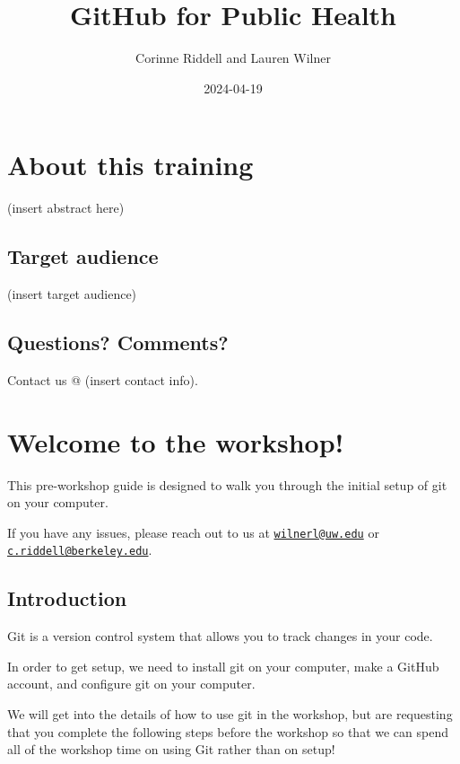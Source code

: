 \documentclass[
]{book}
\title{GitHub for Public Health}
\author{Corinne Riddell and Lauren Wilner}
\date{2024-04-19}
\begin{document}
\maketitle

{
\setcounter{tocdepth}{1}
\tableofcontents
}
\hypertarget{about-this-training}{%
\chapter{About this training}\label{about-this-training}}

(insert abstract here)

\hypertarget{target-audience}{%
\section{Target audience}\label{target-audience}}

(insert target audience)

\hypertarget{questions-comments}{%
\section{Questions? Comments?}\label{questions-comments}}

Contact us @ (insert contact info).

\hypertarget{welcome-to-the-workshop}{%
\chapter{Welcome to the workshop!}\label{welcome-to-the-workshop}}

This pre-workshop guide is designed to walk you through the initial setup of git on your computer.

If you have any issues, please reach out to us at \href{mailto:wilnerl@uw.edu}{\nolinkurl{wilnerl@uw.edu}} or \href{mailto:c.riddell@berkeley.edu}{\nolinkurl{c.riddell@berkeley.edu}}.

\hypertarget{introduction}{%
\section{Introduction}\label{introduction}}

Git is a version control system that allows you to track changes in your code.

In order to get setup, we need to install git on your computer, make a GitHub account, and configure git on your computer.

We will get into the details of how to use git in the workshop, but are requesting that you complete the following steps before the workshop so that we can spend all of the workshop time on using Git rather than on setup!
\end{document}
